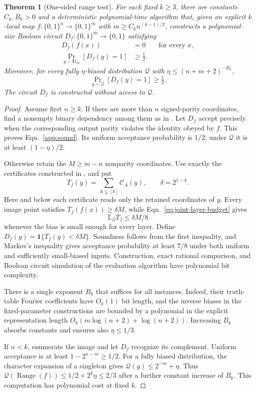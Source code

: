 \documentclass[letterpaper,11pt]{article}
\newtheorem{theorem}{Theorem}
\theoremstyle{definition}
\newcommand{\E}{\mathbb E}
\newcommand{\U}{\mathbf U}
\DeclareMathOperator{\Range}{Range}
\begin{document}
\begin{theorem}[One-sided range test]\label{thm:onesided}
For each fixed $k\ge3$, there are constants $C_k,B_k>0$ and a
deterministic polynomial-time algorithm that, given an explicit
$k$-local map $f:\{0,1\}^n\to\{0,1\}^m$ with
$m\ge C_kn^{(k-1)/2}$, constructs a polynomial-size Boolean circuit
$D_f:\{0,1\}^m\to\{0,1\}$ satisfying
\begin{align}
 D_f(f(x))&=0 &&\text{for every }x,\label{app:sound}\\
 \Pr_{y\sim\U_m}[D_f(y)=1]&\ge\tfrac12.\label{app:uniform}
\end{align}
Moreover, for every fully $\eta$-biased distribution $\mathcal Q$ with
$\eta\le(n+m+2)^{-B_k}$,
\begin{equation}\label{app:biased}
 \Pr_{y\sim\mathcal Q}[D_f(y)=1]\ge\tfrac13.
\end{equation}
The circuit $D_f$ is constructed without access to $\mathcal Q$.
\end{theorem}

\begin{proof}
Assume first $n\ge k$. If there are more than $n$ signed-parity
coordinates, find a nonempty binary dependency among them as in
. Let $D_f$ accept precisely when the corresponding
output parity violates the identity obeyed by $f$. This proves
Eqn.~\eqref{app:sound}. Its uniform acceptance probability is $1/2$;
under $\mathcal Q$ it is at least $(1-\eta)/2$.

Otherwise retain the $M\ge m-n$ nonparity coordinates. Use exactly the
certificates constructed in , and put
\[
 T_f(y)=\sum_{A\subsetneq[k]}\mathcal C_A(y),
 \qquad \delta=2^{1-k}.
\]
Here and below each certificate reads only the retained coordinates
of $y$. Every image point satisfies $T_f(f(x))\ge\delta M$, while
Eqn.~\eqref{eq:joint-layer-budget} gives
\[
 \E_{\mathcal Q}T_f\le\delta M/8
\]
whenever the bias is small enough for every layer. Define
$D_f(y)=\mathbf1\{T_f(y)<\delta M\}$. Soundness follows from the
first inequality, and Markov's inequality gives acceptance probability
at least $7/8$ under both uniform and sufficiently small-biased inputs.
Construction, exact rational comparison, and Boolean circuit simulation
of the evaluation algorithm have polynomial bit complexity.

There is a single exponent $B_k$ that suffices for all instances.
Indeed, their truth-table Fourier coefficients have $O_k(1)$ bit length,
and the inverse biases in the fixed-parameter constructions are bounded
by a polynomial in the explicit representation length
$O_k(m\log(n+2)+\log(n+2))$. Increasing $B_k$ absorbs constants and
ensures also $\eta\le1/3$.

If $n<k$, enumerate the image and let $D_f$ recognize its complement.
Uniform acceptance is at least $1-2^{n-m}\ge1/2$. For a fully biased
distribution, the character expansion of a singleton gives
$\mathcal Q(y)\le2^{-m}+\eta$. Thus
$\mathcal Q(\Range(f))\le1/2+2^k\eta\le2/3$ after a further constant
increase of $B_k$. This computation has polynomial cost at fixed $k$.
\end{proof}
\end{document}
